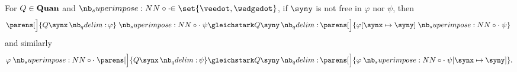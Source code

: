 \begin{proposition}\label{thm:pulling_quantifiers_out}
  For \( Q \in \op*{Quan} \) and \( \syncirc \in \set{ \synvee, \synwedge } \), if \( \syny \) is not free in \( \varphi \) nor \( \psi \), then
  \begin{equation}\label{thm:pulling_quantifiers_out/first}
    \parens[\Big]{ \quantifier Q \synx \varphi } \syncirc \psi \gleichstark \quantifier Q \syny \parens[\Big]{ \varphi[\synx \mapsto \syny] \syncirc \psi }\phantom{.}
  \end{equation}
  and similarly
  \begin{equation}\label{thm:pulling_quantifiers_out/second}
    \varphi \syncirc \parens[\Big]{ \quantifier Q \synx \psi } \gleichstark \quantifier Q \syny \parens[\Big]{ \varphi \syncirc \psi[\synx \mapsto \syny] }.
  \end{equation}
\end{proposition}
